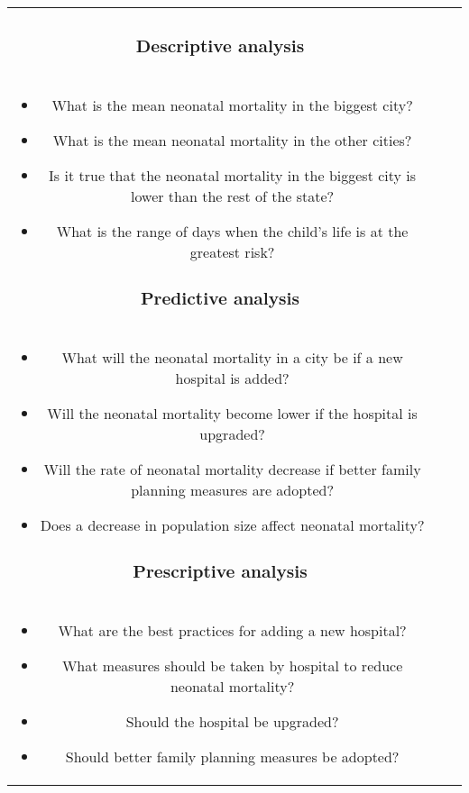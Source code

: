 \documentclass[12pt]{article}
\begin{document}
\begin{center}
\begin{tabular}{ |c|c|c|}
    \subsubsection*{Descriptive analysis}\\
    \begin{itemize}
        \item What is the mean neonatal mortality in the biggest city?
        \item What is the mean neonatal mortality in the other cities?
        \item Is it true that the neonatal mortality in the biggest city is lower than the rest of the state?
        \item What is the range of days when the child's life is at the greatest risk?
    \end{itemize}

    \subsubsection*{Predictive analysis}\\
    \begin{itemize}
        \item What will the neonatal mortality in a city be if a new hospital is added?
        \item Will the neonatal mortality become lower if the hospital is upgraded?
        \item Will the rate of neonatal mortality decrease if better family planning measures are adopted?
        \item Does a decrease in population size affect neonatal mortality?
    \end{itemize}

    \subsubsection*{Prescriptive analysis}\\
    \begin{itemize}
        \item What are the best practices for adding a new hospital?
        \item What measures should be taken by hospital to reduce neonatal mortality?
        \item Should the hospital be upgraded?
        \item Should better family planning measures be adopted?
    \end{itemize}


\end{tabular}
\end{center}
\end{document}
